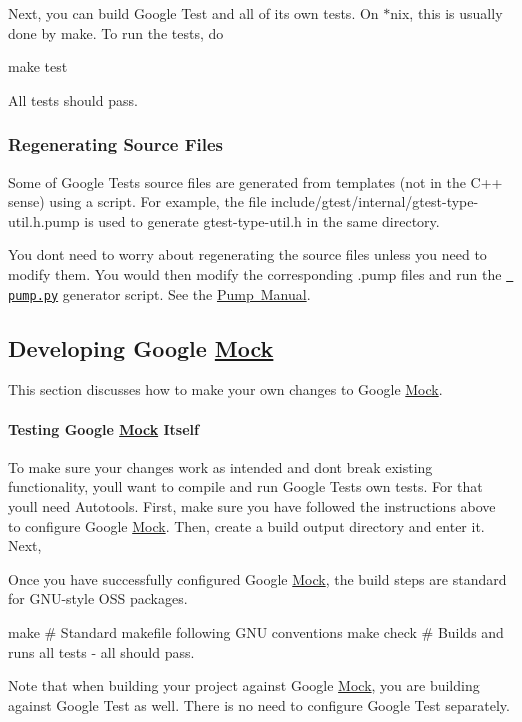 Next, you can build Google Test and all of its own tests. On $\ast$nix, this is usually done by \textquotesingle{}make\textquotesingle{}. To run the tests, do \begin{DoxyVerb}make test
\end{DoxyVerb}


All tests should pass.

\subsubsection*{Regenerating Source Files}

Some of Google Test\textquotesingle{}s source files are generated from templates (not in the C++ sense) using a script. For example, the file include/gtest/internal/gtest-\/type-\/util.\+h.\+pump is used to generate gtest-\/type-\/util.\+h in the same directory.

You don\textquotesingle{}t need to worry about regenerating the source files unless you need to modify them. You would then modify the corresponding {\ttfamily .pump} files and run the \textquotesingle{}\href{googletest/scripts/pump.py}{\texttt{ pump.\+py}}\textquotesingle{} generator script. See the \mbox{\hyperlink{_obj__test_2lib_2googletest-release-1_88_81_2googletest_2docs_2_pump_manual_8md}{Pump Manual}}.

\subsection*{Developing Google \mbox{\hyperlink{class_mock}{Mock}}}

This section discusses how to make your own changes to Google \mbox{\hyperlink{class_mock}{Mock}}.

\paragraph*{Testing Google \mbox{\hyperlink{class_mock}{Mock}} Itself}

To make sure your changes work as intended and don\textquotesingle{}t break existing functionality, you\textquotesingle{}ll want to compile and run Google Test\textquotesingle{}s own tests. For that you\textquotesingle{}ll need Autotools. First, make sure you have followed the instructions above to configure Google \mbox{\hyperlink{class_mock}{Mock}}. Then, create a build output directory and enter it. Next, 


Once you have successfully configured Google \mbox{\hyperlink{class_mock}{Mock}}, the build steps are standard for G\+N\+U-\/style O\+SS packages. \begin{DoxyVerb}make        # Standard makefile following GNU conventions
make check  # Builds and runs all tests - all should pass.
\end{DoxyVerb}


Note that when building your project against Google \mbox{\hyperlink{class_mock}{Mock}}, you are building against Google Test as well. There is no need to configure Google Test separately. 